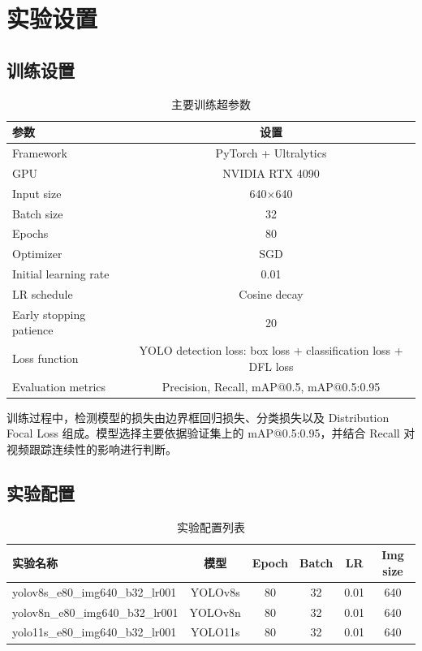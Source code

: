 \documentclass[UTF8,a4paper,12pt]{ctexart}
\begin{document}
\section{实验设置}

\subsection{训练设置}

\begin{table}[H]
    \centering
    \caption{主要训练超参数}
    \begin{tabular}{lc}
        \toprule
        参数 & 设置 \\
        \midrule
        Framework & PyTorch + Ultralytics \\
        GPU & NVIDIA RTX 4090 \\
        Input size & 640$\times$640 \\
        Batch size & 32 \\
        Epochs & 80 \\
        Optimizer & SGD \\
        Initial learning rate & 0.01 \\
        LR schedule & Cosine decay \\
        Early stopping patience & 20 \\
        Loss function & YOLO detection loss: box loss + classification loss + DFL loss \\
        Evaluation metrics & Precision, Recall, mAP@0.5, mAP@0.5:0.95 \\
        \bottomrule
    \end{tabular}
\end{table}

训练过程中，检测模型的损失由边界框回归损失、分类损失以及 Distribution Focal Loss 组成。模型选择主要依据验证集上的 mAP@0.5:0.95，并结合 Recall 对视频跟踪连续性的影响进行判断。

\subsection{实验配置}

\begin{table}[H]
    \centering
    \caption{实验配置列表}
    \begin{tabular}{lccccc}
        \toprule
        实验名称 & 模型 & Epoch & Batch & LR & Img size \\
        \midrule
        yolov8s\_e80\_img640\_b32\_lr001 & YOLOv8s & 80 & 32 & 0.01 & 640 \\
        yolov8n\_e80\_img640\_b32\_lr001 & YOLOv8n & 80 & 32 & 0.01 & 640 \\
        yolo11s\_e80\_img640\_b32\_lr001 & YOLO11s & 80 & 32 & 0.01 & 640 \\
        \bottomrule
    \end{tabular}
\end{table}
\end{document}
